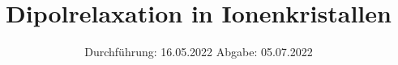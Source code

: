 

\subject{Versuch Nr.V48}
\title{Dipolrelaxation in Ionenkristallen}
\date{%
  Durchführung: 16.05.2022
  \hspace{3em}
  Abgabe: 05.07.2022
}



\maketitle
\thispagestyle{empty}
\tableofcontents
\newpage 








\nocite{*}

\printbibliography{}



